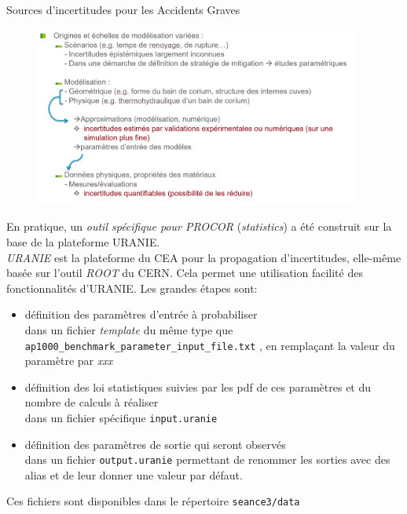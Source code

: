 \begin{frame}[fragile]
Sources d'incertitudes pour les Accidents Graves
\begin{figure}
\centering \includegraphics[width=0.95\textwidth]{Figures/Stat_OriginesIncert.png} 
\end{figure}


\end{frame}


\begin{frame}[fragile]
En pratique, un \emph{outil spécifique pour PROCOR} (\textit{statistics}) a été construit sur la base de la plateforme URANIE.\\
\emph{URANIE} est la plateforme du CEA pour la propagation d'incertitudes, elle-même basée sur l'outil \emph{ROOT} du CERN.
Cela permet une utilisation facilité des fonctionnalités d'URANIE. Les grandes étapes sont: 
\begin{itemize}
\item définition des paramètres d'entrée à probabiliser \\
dans un fichier \textit{template} du même type que \texttt{ap1000\_benchmark\_parameter\_input\_file.txt} , en remplaçant la valeur du paramètre par \textit{xxx}

\item définition des loi statistiques suivies par les pdf de ces paramètres et du nombre de calculs à réaliser\\
dans un fichier spécifique \texttt{input.uranie}

\item définition des paramètres de sortie qui seront observés \\
dans un fichier \texttt{output.uranie} permettant de renommer les sorties avec des alias et de leur donner une valeur par défaut.

\end{itemize}

Ces fichiers sont disponibles dans le répertoire \texttt{seance3/data}

\end{frame}


